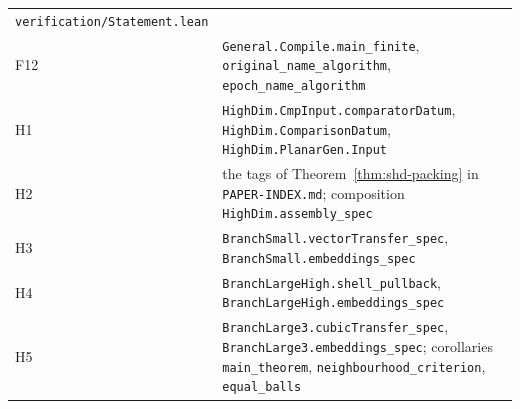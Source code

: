 {\begin{longtable}{@{}p{}>{\raggedright\arraybackslash}p{}@{}}
 \texttt{verification/Statement.lean}\\
F12 & \texttt{General.Compile.main\_finite}, \texttt{original\_name\_algorithm}, \texttt{epoch\_name\_algorithm}\\
H1 & \texttt{HighDim.CmpInput.comparatorDatum}, \texttt{HighDim.ComparisonDatum}, \texttt{HighDim.PlanarGen.Input}\\
H2 & the tags of Theorem~\ref{thm:shd-packing} in \texttt{PAPER-INDEX.md}; composition \texttt{HighDim.assembly\_spec}\\
H3 & \texttt{BranchSmall.vectorTransfer\_spec}, \texttt{BranchSmall.embeddings\_spec}\\
H4 & \texttt{BranchLargeHigh.shell\_pullback}, \texttt{BranchLargeHigh.embeddings\_spec}\\
H5 & \texttt{BranchLarge3.cubicTransfer\_spec}, \texttt{BranchLarge3.embeddings\_spec}; corollaries
 \texttt{main\_theorem}, \texttt{neighbourhood\_criterion}, \texttt{equal\_balls}\\
\end{longtable}
}
\endgroup
